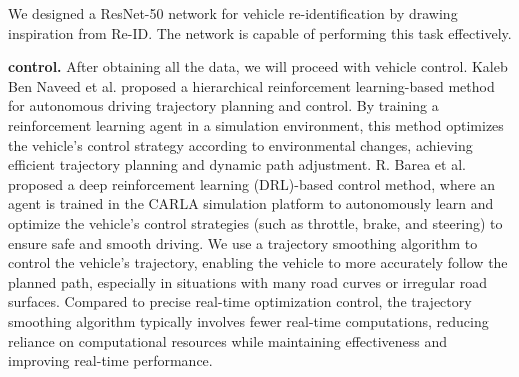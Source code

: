 We designed a ResNet-50 network for vehicle re-identification by drawing inspiration from Re-ID.
The network is capable of performing this task effectively.

\textbf{control.}
After obtaining all the data, we will proceed with vehicle control. 
Kaleb Ben Naveed et al. proposed a hierarchical reinforcement learning-based method for autonomous driving trajectory planning and control. 
By training a reinforcement learning agent in a simulation environment, this method optimizes the vehicle's control strategy according to environmental changes, achieving efficient trajectory planning and dynamic path adjustment. 
R. Barea et al. proposed a deep reinforcement learning (DRL)-based control method, where an agent is trained in the CARLA simulation platform to autonomously learn and optimize the vehicle's control strategies (such as throttle, brake, and steering) to ensure safe and smooth driving. 
We use a trajectory smoothing algorithm to control the vehicle's trajectory, enabling the vehicle to more accurately follow the planned path, especially in situations with many road curves or irregular road surfaces. 
Compared to precise real-time optimization control, the trajectory smoothing algorithm typically involves fewer real-time computations, reducing reliance on computational resources while maintaining effectiveness and improving real-time performance.
